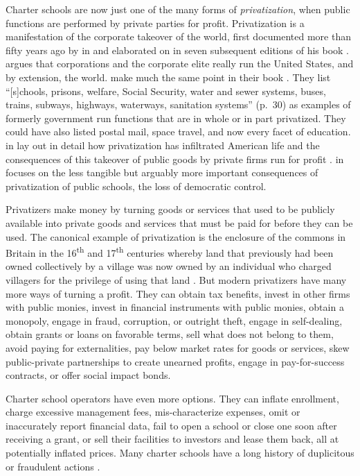 Charter schools are now just one of the many forms of \textit{privatization}, when public functions are performed by private parties for profit. Privatization is a manifestation of the corporate takeover of the world, first documented more than fifty years ago by \citeauthor{Domhoff2014} in and elaborated on in seven subsequent editions of his book . \citeauthor{Domhoff2014} argues that corporations and the corporate elite really run the United States, and by extension, the world. \textcite{Kahn.Minnich2005} make much the same point in their book  \parencite{Kahn.Minnich2005}. They list ``[s]chools, prisons, welfare, Social Security, water and sewer systems, buses, trains, subways, highways, waterways, sanitation systems'' (p.~30) as examples of formerly government run functions that are in whole or in part privatized. They could have also listed postal mail, space travel, and now every facet of education. \citeauthor{Cohen.Mikaelian2021} in  lay out in detail how privatization has infiltrated American life and the consequences of this takeover of public goods by private firms run for profit  \parencite{Cohen.Mikaelian2021}. \citeauthor{Black2020} in  \parencite{Black2020} focuses on the less tangible but arguably more important consequences of privatization of public schools, the loss of democratic control.

Privatizers make money by turning goods or services that used to be publicly available into private goods and services that must be paid for before they can be used. The canonical example of privatization is the enclosure of the commons in Britain in the 16\textsuperscript{th} and 17\textsuperscript{th} centuries whereby land that previously had been owned collectively by a village was now owned by an individual who charged villagers for the privilege of using that land \parencite{SimonFairlie2009}. But modern privatizers have many more ways of turning a profit. They can obtain tax benefits, invest in other firms with public monies, invest in financial instruments with public monies, obtain a monopoly, engage in fraud, corruption, or outright theft, engage in self-dealing, obtain grants or loans on favorable terms, sell what does not belong to them, avoid paying for externalities, pay below market rates for goods or services, skew public-private partnerships to create unearned profits, engage in pay-for-success contracts, or offer social impact bonds.

Charter school operators have even more options. They can inflate enrollment, charge excessive management fees, mis-characterize expenses, omit or inaccurately report financial data, fail to open a school or close one soon after receiving a grant, or sell their facilities to investors and lease them back, all at potentially inflated prices. Many charter schools have a long history of duplicitous or fraudulent actions \parencite{Baker.Miron2015, Burris.Bryant2020, ITPI2018, Lafer.etal2021}.

